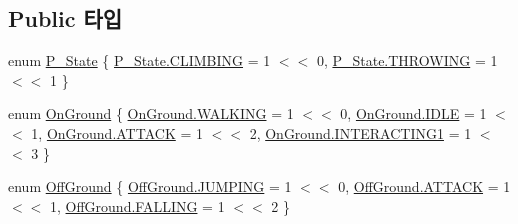 \subsection*{Public 타입}
\begin{DoxyCompactItemize}
\item 
enum \mbox{\hyperlink{class_player_state_afe68f1a1529955d173ccd309da55001b}{P\+\_\+\+State}} \{ \mbox{\hyperlink{class_player_state_afe68f1a1529955d173ccd309da55001bafc4db29e596cb9d0d1de3cdc00b982f1}{P\+\_\+\+State.\+C\+L\+I\+M\+B\+I\+NG}} = 1 $<$$<$ 0, 
\mbox{\hyperlink{class_player_state_afe68f1a1529955d173ccd309da55001ba118050df28f155ec919c245101f050e5}{P\+\_\+\+State.\+T\+H\+R\+O\+W\+I\+NG}} = 1 $<$$<$ 1
 \}
\item 
enum \mbox{\hyperlink{class_state_ab9eb1c1d81f1903b8486d1275e78b68e}{On\+Ground}} \{ \mbox{\hyperlink{class_state_ab9eb1c1d81f1903b8486d1275e78b68ea606c114184493a665cf1f6a12fbab9d3}{On\+Ground.\+W\+A\+L\+K\+I\+NG}} = 1 $<$$<$ 0, 
\mbox{\hyperlink{class_state_ab9eb1c1d81f1903b8486d1275e78b68eaa5daf7f2ebbba4975d61dab1c40188c7}{On\+Ground.\+I\+D\+LE}} = 1 $<$$<$ 1, 
\mbox{\hyperlink{class_state_ab9eb1c1d81f1903b8486d1275e78b68eac6ddd0f72ff2fd344693b9ca8d483871}{On\+Ground.\+A\+T\+T\+A\+CK}} = 1 $<$$<$ 2, 
\mbox{\hyperlink{class_state_ab9eb1c1d81f1903b8486d1275e78b68ea0f85e9fa4c9d9011849fd3bfcae6a2c0}{On\+Ground.\+I\+N\+T\+E\+R\+A\+C\+T\+I\+N\+G1}} = 1 $<$$<$ 3
 \}
\item 
enum \mbox{\hyperlink{class_state_a7d945e793324c017a973205564cf1a56}{Off\+Ground}} \{ \mbox{\hyperlink{class_state_a7d945e793324c017a973205564cf1a56a6de49bfda8068b7bc3b0c0e3d2e43134}{Off\+Ground.\+J\+U\+M\+P\+I\+NG}} = 1 $<$$<$ 0, 
\mbox{\hyperlink{class_state_a7d945e793324c017a973205564cf1a56ac6ddd0f72ff2fd344693b9ca8d483871}{Off\+Ground.\+A\+T\+T\+A\+CK}} = 1 $<$$<$ 1, 
\mbox{\hyperlink{class_state_a7d945e793324c017a973205564cf1a56a4f9d4539ac1e11a251e2afe022eba4e6}{Off\+Ground.\+F\+A\+L\+L\+I\+NG}} = 1 $<$$<$ 2
 \}
\end{DoxyCompactItemize}
